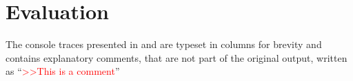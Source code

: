 \chapter{Evaluation}
\label{chap:evaluation}

\newcommand{\cmt}[1]{\textcolor{Red}{>>#1}}

The console traces presented in  and
 are typeset in columns for brevity and
contains explanatory comments, that are not part of the original output, written
as ``\cmt{This is a comment}''








